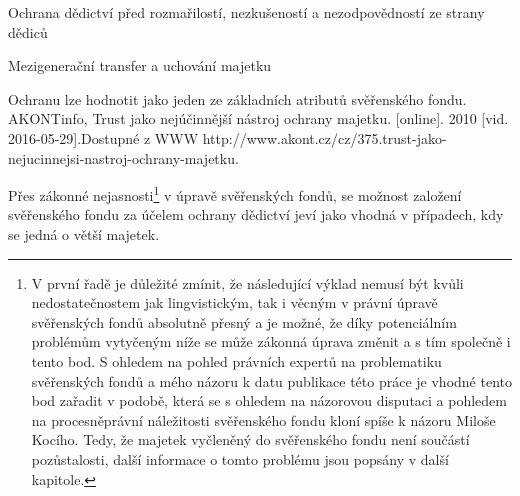 \documentclass{article}
\begin{document}
 
 
 
 \begin{enumerate}
 {\Large\item Ochrana dědictví před rozmařilostí, nezkušeností a nezodpovědností ze strany dědiců}
 \item[1.] Mezigenerační transfer a uchování majetku
 \end{enumerate}
 
 Ochranu lze hodnotit jako jeden ze základních atributů svěřenského fondu. AKONTinfo, Trust jako nejúčinnější nástroj ochrany majetku. [online]. 2010 [vid. 2016-05-29].Dostupné z WWW http://www.akont.cz/cz/375.trust-jako-nejucinnejsi-nastroj-ochrany-majetku. 
 
 Přes zákonné nejasnosti\footnote{ V první řadě je důležité zmínit, že následující výklad nemusí být kvůli nedostatečnostem jak lingvistickým, tak i věcným v právní úpravě svěřenských fondů absolutně přesný a je možné, že díky potenciálním problémům vytyčeným níže se může zákonná úprava změnit a s tím společně i tento bod. S ohledem na pohled právních expertů na problematiku svěřenských fondů a mého názoru k datu publikace této práce je vhodné tento bod zařadit v podobě, která se s ohledem na názorovou disputaci a pohledem na procesněprávní náležitosti svěřenského fondu kloní spíše k názoru Miloše Kocího. Tedy, že majetek vyčleněný do svěřenského fondu není součástí pozůstalosti, další informace o tomto problému jsou popsány v další kapitole.} v úpravě svěřenských fondů, se možnost založení svěřenského fondu za účelem ochrany dědictví jeví jako vhodná v případech, kdy se jedná o větší majetek.\\
 
\end{document}
